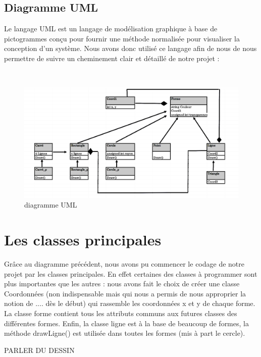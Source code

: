 \documentclass[11pt]{article}
\begin{document}
\clearpage

\subsection{Diagramme UML}
Le langage UML est un langage de modélisation graphique à base de pictogrammes conçu pour fournir une méthode normalisée pour visualiser la conception d'un système. Nous avons donc utilisé ce langage afin de nous de nous permettre de suivre un cheminement clair et détaillé de notre projet :

\
\

\begin{figure}[!htbp]
    \begin{center}
        \includegraphics[width=20cm]{Photo2.png}
        \caption{diagramme UML}
    \centering
    \end{center}
\end{figure}

\section{Les classes principales}

Grâce au diagramme précédent, nous avons pu commencer le codage de notre projet par les classes principales. En effet certaines des classes à programmer sont plus importantes que les autres : nous avons fait le choix de créer une classe Coordonnées (non indispensable mais qui nous a permis de nous approprier la notion de .... dès le début) qui rassemble les coordonnées x et y de chaque forme. La classe forme contient tous les attributs communs aux futures classes des différentes formes. Enfin, la classe ligne est à la base de beaucoup de formes, la méthode drawLigne() est utilisée dans toutes les formes (mis à part le cercle).

PARLER DU DESSIN
\end{document}
